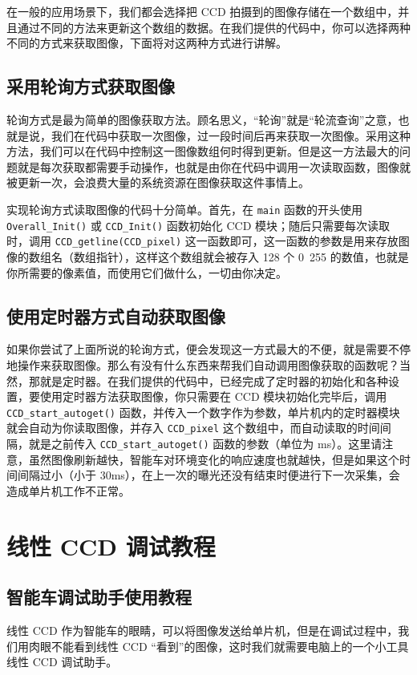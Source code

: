 在一般的应用场景下，我们都会选择把 CCD 拍摄到的图像存储在一个数组中，并且通过不同的方法来更新这个数组的数据。在我们提供的代码中，你可以选择两种不同的方式来获取图像，下面将对这两种方式进行讲解。

\subsection{采用轮询方式获取图像}
轮询方式是最为简单的图像获取方法。顾名思义，“轮询”就是“轮流查询”之意，也就是说，我们在代码中获取一次图像，过一段时间后再来获取一次图像。采用这种方法，我们可以在代码中控制这一图像数组何时得到更新。但是这一方法最大的问题就是每次获取都需要手动操作，也就是由你在代码中调用一次读取函数，图像就被更新一次，会浪费大量的系统资源在图像获取这件事情上。

实现轮询方式读取图像的代码十分简单。首先，在 \lstinline{main} 函数的开头使用 \lstinline{Overall_Init()} 或 \lstinline{CCD_Init()} 函数初始化 CCD 模块；随后只需要每次读取时，调用 \lstinline{CCD_getline(CCD_pixel)} 这一函数即可，这一函数的参数是用来存放图像的数组名（数组指针），这样这个数组就会被存入 128 个 0~255 的数值，也就是你所需要的像素值，而使用它们做什么，一切由你决定。

\subsection{使用定时器方式自动获取图像}
如果你尝试了上面所说的轮询方式，便会发现这一方式最大的不便，就是需要不停地操作来获取图像。那么有没有什么东西来帮我们自动调用图像获取的函数呢？当然，那就是定时器。在我们提供的代码中，已经完成了定时器的初始化和各种设置，要使用定时器方法获取图像，你只需要在 CCD 模块初始化完毕后，调用 \lstinline{CCD_start_autoget()} 函数，并传入一个数字作为参数，单片机内的定时器模块就会自动为你读取图像，并存入 \lstinline{CCD_pixel} 这个数组中，而自动读取的时间间隔，就是之前传入 \lstinline{CCD_start_autoget()} 函数的参数（单位为 ms）。这里请注意，虽然图像刷新越快，智能车对环境变化的响应速度也就越快，但是如果这个时间间隔过小（小于 30ms），在上一次的曝光还没有结束时便进行下一次采集，会造成单片机工作不正常。

\section{线性 CCD 调试教程}

\subsection{智能车调试助手使用教程}
线性 CCD 作为智能车的眼睛，可以将图像发送给单片机，但是在调试过程中，我们用肉眼不能看到线性 CCD “看到”的图像，这时我们就需要电脑上的一个小工具\raisebox{0.5mm}{------}线性 CCD 调试助手。

